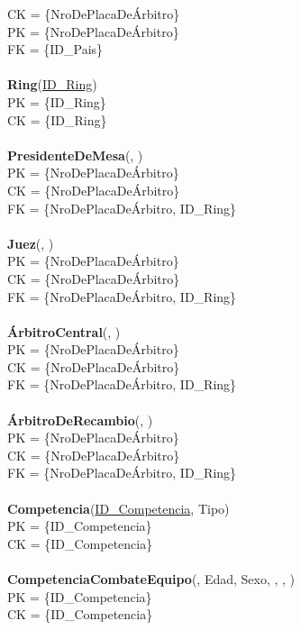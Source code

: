 CK = \{NroDePlacaDeÁrbitro\}\\
PK = \{NroDePlacaDeÁrbitro\}\\
FK = \{ID\_Pais\}\\
\\
\textbf{Ring}(\uline{ID\_Ring})\\
PK = \{ID\_Ring\}\\
CK = \{ID\_Ring\}\\
\\
\textbf{PresidenteDeMesa}(, )\\
PK = \{NroDePlacaDeÁrbitro\}\\
CK = \{NroDePlacaDeÁrbitro\}\\
FK = \{NroDePlacaDeÁrbitro, ID\_Ring\}\\
\\
\textbf{Juez}(, )\\
PK = \{NroDePlacaDeÁrbitro\}\\
CK = \{NroDePlacaDeÁrbitro\}\\
FK = \{NroDePlacaDeÁrbitro, ID\_Ring\}\\
\\
\textbf{ÁrbitroCentral}(, )\\
PK = \{NroDePlacaDeÁrbitro\}\\
CK = \{NroDePlacaDeÁrbitro\}\\
FK = \{NroDePlacaDeÁrbitro, ID\_Ring\}\\
\\
\textbf{ÁrbitroDeRecambio}(, )\\
PK = \{NroDePlacaDeÁrbitro\}\\
CK = \{NroDePlacaDeÁrbitro\}\\
FK = \{NroDePlacaDeÁrbitro, ID\_Ring\}\\
\\
\textbf{Competencia}(\uline{ID\_Competencia}, Tipo)\\
PK = \{ID\_Competencia\}\\
CK = \{ID\_Competencia\}\\
\\
\textbf{CompetenciaCombateEquipo}(, Edad, Sexo, , , )\\
PK = \{ID\_Competencia\}\\
CK = \{ID\_Competencia\}\\
